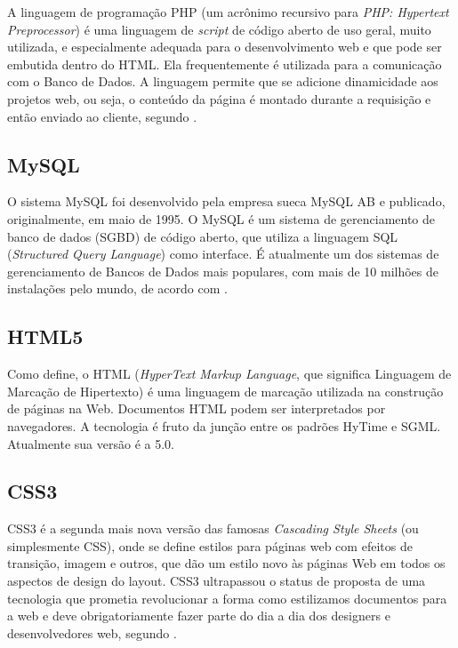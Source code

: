A linguagem de programação PHP (um acrônimo recursivo para \textit{PHP: Hypertext Preprocessor}) é uma linguagem de \textit{script} de código aberto de uso geral, muito utilizada, e especialmente adequada para o desenvolvimento web e que pode ser embutida dentro do HTML. Ela frequentemente é utilizada para a comunicação com o Banco de Dados. A linguagem permite que se adicione dinamicidade aos projetos web, ou seja, o conteúdo da página é montado durante a requisição e então enviado ao cliente, segundo .

\subsection{MySQL}

O sistema MySQL foi desenvolvido pela empresa sueca MySQL AB e publicado, originalmente, em maio de 1995. O MySQL é um sistema de gerenciamento de banco de dados (SGBD) de código aberto, que utiliza a linguagem SQL (\textit{Structured Query Language}) como interface. É atualmente um dos sistemas de gerenciamento de Bancos de Dados mais populares, com mais de 10 milhões de instalações pelo mundo, de acordo com .

\subsection{HTML5}

Como  define, o HTML (\textit{HyperText Markup Language}, que significa Linguagem de Marcação de Hipertexto) é uma linguagem de marcação utilizada na construção de páginas na Web. Documentos HTML podem ser interpretados por navegadores. A tecnologia é fruto da junção entre os padrões HyTime e SGML. Atualmente sua versão é a 5.0.

\subsection{CSS3}

CSS3 é a segunda mais nova versão das famosas \textit{Cascading Style Sheets} (ou simplesmente CSS), onde se define estilos para páginas web com efeitos de transição, imagem e outros, que dão um estilo novo às páginas Web em todos os aspectos de design do layout. CSS3 ultrapassou o status de proposta de uma tecnologia que prometia revolucionar a forma como estilizamos documentos para a web e deve obrigatoriamente fazer parte do dia a dia dos designers e desenvolvedores web, segundo .

